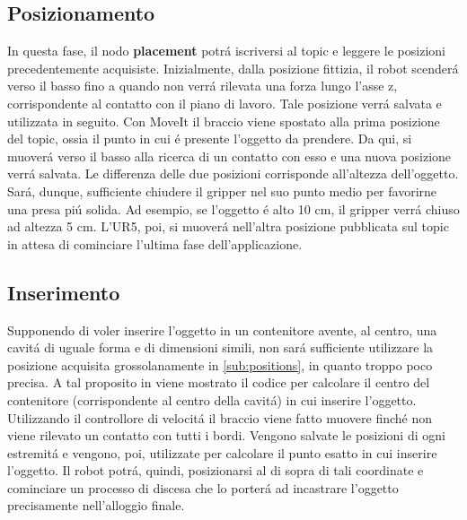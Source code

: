 \subsection{Posizionamento} \label{sub:placement}
In questa fase, il nodo \textbf{placement} \cite{placement} potr\'{a} iscriversi al topic e leggere le posizioni precedentemente 
acquisiste. Inizialmente, dalla posizione fittizia, il robot scender\'{a} verso il basso fino a quando non verr\'{a} rilevata 
una forza lungo l'asse z, corrispondente al contatto con il piano di lavoro. Tale posizione verr\'{a} salvata e utilizzata in seguito. 
Con MoveIt il braccio viene spostato alla prima posizione del topic, ossia il punto in cui \'{e} presente l'oggetto da prendere.
Da qui, si muover\'{a} verso il basso alla ricerca di un contatto con esso e una nuova posizione verr\'{a} salvata. 
Le differenza delle due posizioni corrisponde all'altezza dell'oggetto. Sar\'{a}, dunque, sufficiente chiudere il gripper 
nel suo punto medio per favorirne una presa pi\'{u} solida. Ad esempio, se l'oggetto \'{e} alto 10 cm, il gripper verr\'{a} chiuso 
ad altezza 5 cm. 
L'UR5, poi, si muover\'{a} nell'altra posizione pubblicata sul topic in attesa di cominciare l'ultima fase dell'applicazione.
\subsection{Inserimento} \label{sub:insertion}
Supponendo di voler inserire l'oggetto in un contenitore avente, al centro, una cavit\'{a} di uguale forma e di dimensioni simili, 
non sar\'{a} sufficiente utilizzare la posizione acquisita grossolanamente in \ref{sub:positions}, in quanto troppo poco precisa. 
A tal proposito in \cite{insertion} viene mostrato il codice per calcolare il centro del contenitore (corrispondente al 
centro della cavit\'{a}) in cui inserire l'oggetto. Utilizzando il controllore di velocit\'{a} il braccio viene fatto muovere 
finch\'{e} non viene rilevato un contatto con tutti i bordi. Vengono salvate le posizioni di ogni estremit\'{a} e vengono, poi, 
utilizzate per calcolare il punto esatto in cui inserire l'oggetto. Il robot potr\'{a}, quindi, posizionarsi al di sopra di 
tali coordinate e cominciare un processo di discesa che lo porter\'{a} ad incastrare l'oggetto precisamente nell'alloggio finale.

